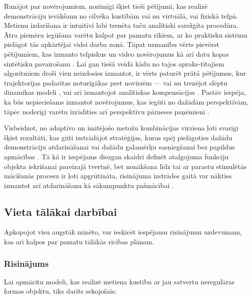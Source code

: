 \documentclass[12pt, a4paper]{article}
\numberwithin{equation}{section} %
\begin{document}
Runājot par novērojumiem, nozīmīgi šķiet tieši pētījumi, kas realizē demonstrāciju ievākšanu no cilvēka kustībām \cite{jha2017imitation,zhang2018deep} vai nu virtuālā, vai fiziskā telpā. Metienu izdarīšana ir intuitīvi labi trenēta taču analītiski sarežģīta procedūra. Ātra piemēru iegūšana varētu kalpot par pamatu rīkiem, ar ko praktisku sistēmu pielāgot tās apkārtējai videi darba zonā. Tāpat uzmanību vērts pievērst pētījumiem, kas izmanto telpiskus un video novērojumus kā arī datu kopas sintētisku pavairošanu \cite{dyrstad2018teaching}. Lai gan tiešā veidā kādu no tajos apraks-tītajiem algoritmiem droši vien neizdosies izmantot, ir vērts paturēt prātā pētījumus, kur trajektorijas padarītas noturīgākas pret novirzēm --- vai nu trenējot slēptu dinamikas modeli \cite{torabi2018behavioral}, vai arī izmantojot analītiskas kompensācijas \cite{pastor2011online}. Pastāv iespēja, ka būs nepieciešams izmantot novērojumus, kas iegūti no dažādām perspektīvām, tāpēc noderīgi varētu izrādīties arī perspektīvu pārneses paņēmieni \cite{liu2018imitation}.

Visbeidzot, no adaptīvo un imitējošo metožu kombinācijas virziena ļoti svarīgi šķiet rezultāti, kas gūti izstrādājot stratēģijas, kuras spēj pielāgoties dažādu demonstrāciju atdarināšanai \cite{duan2017one} vai dažādu galamērķu sasniegšanai bez papildus apmācības \cite{lynch2020learning,lynch2021language,gupta2019relay}. Tā kā ir iespējams diezgan skaidri definēt atalgojuma funkciju objekta iekrišanai pareizajā tvertnē, bet nonākšana līdz tai ar parastu stimulētās mācīšanās procesu ir ļoti apgrūtināta, risinājuma izstrādes gaitā var nākties izmantot arī atdarināšanu kā sākumpunktu pašmācībai \cite{hester2018deep}. 



\subsection*{Vieta tālākai darbībai}

Apkopojot visu augstāk minēto, var ieskicēt iespējamu risinājumu uzdevumam, kas arī kalpos par pamatu tālākās rīcības plānam. 

\subsubsection*{Risinājums}

Lai apmācītu modeli, kas realizē metiena kustību ar jau satvertu neregulāras formas objektu, tiks darīts sekojošais:
\end{document}
